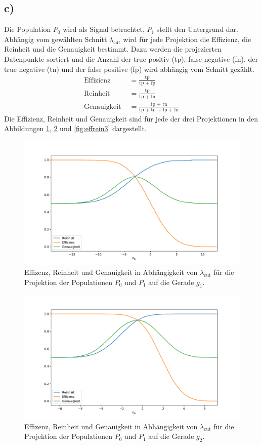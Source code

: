 \documentclass[a4paper, 11pt]{article}
\begin{document}
\subsection*{c)}
Die Population $P_0$ wird als Signal betrachtet, $P_1$ stellt den Untergrund dar.
Abhängig vom gewählten Schnitt $\lambda_\text{cut}$ wird für jede Projektion die
Effizienz, die Reinheit und die Genauigkeit bestimmt. Dazu werden die projezierten
Datenpunkte sortiert und die Anzahl der true positiv (tp), false negative (fn),
der true negative (tn) und der false positive (fp) wird abhängig vom Schnitt
gezählt.
\begin{align*}
  \text{Effizienz } &= \frac{\text{tp}}{\text{tp + fp}} \\
  \text{Reinheit } &= \frac{\text{tp}}{\text{tp + fn}} \\
  \text{Genauigkeit } &= \frac{\text{tp + tn}}{\text{tp + tn + fp + fn}}
\end{align*}
Die Effizienz, Reinheit und Genauigkeit sind für jede der drei Projektionen
in den Abbildungen \ref{fig:effrein1}, \ref{fig:effrein2} und \ref{fig:effrein3}
dargestellt.
\begin{figure}[H]
  \centering
  \includegraphics[width=\textwidth]{../A13/A13c_0}
  \caption{Effizenz, Reinheit und Genauigkeit in Abhängigkeit von $\lambda_\text{cut}$
   für die Projektion der Populationen $P_0$ und $P_1$ auf die Gerade $g_1$.}
  \label{fig:effrein1}
\end{figure}
\begin{figure}[H]
  \centering
  \includegraphics[width=\textwidth]{../A13/A13c_1}
  \caption{Effizenz, Reinheit und Genauigkeit in Abhängigkeit von $\lambda_\text{cut}$
   für die Projektion der Populationen $P_0$ und $P_1$ auf die Gerade $g_2$.}
  \label{fig:effrein2}
\end{figure}
\end{document}
